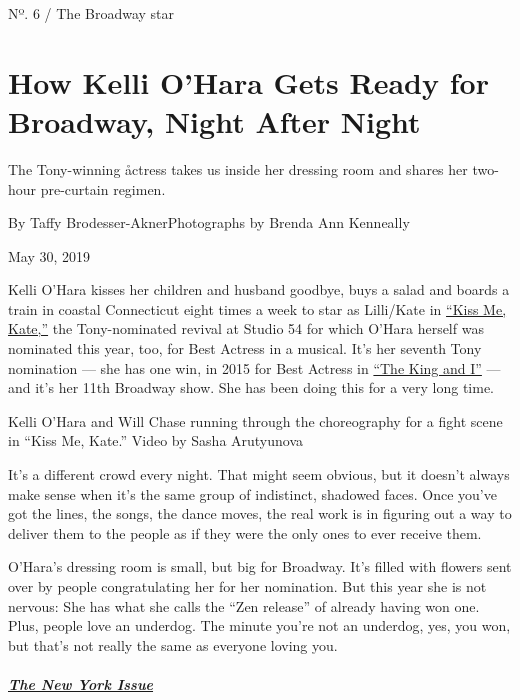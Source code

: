 Nº. 6 / The Broadway star

\hypertarget{how-kelli-ohara-gets-ready-for-broadway-night-after-night-1}{%
\section{How Kelli O'Hara Gets Ready for Broadway, Night After
Night}\label{how-kelli-ohara-gets-ready-for-broadway-night-after-night-1}}

The Tony-winning åctress takes us inside her dressing room and shares
her two-hour pre-curtain regimen.

By Taffy Brodesser-AknerPhotographs by Brenda Ann Kenneally

May 30, 2019

Kelli O'Hara kisses her children and husband goodbye, buys a salad and
boards a train in coastal Connecticut eight times a week to star as
Lilli/Kate in
\href{https://www.nytimes3xbfgragh.onion/2019/03/14/theater/kiss-me-kate-review.html}{``Kiss
Me, Kate,''} the Tony-nominated revival at Studio 54 for which O'Hara
herself was nominated this year, too, for Best Actress in a musical.
It's her seventh Tony nomination --- she has one win, in 2015 for Best
Actress in
\href{https://www.nytimes3xbfgragh.onion/2015/04/17/theater/review-the-king-and-i-back-on-broadway.html}{``The
King and I''} --- and it's her 11th Broadway show. She has been doing
this for a very long time.

Kelli O'Hara and Will Chase running through the choreography for a fight
scene in ``Kiss Me, Kate.'' Video by Sasha Arutyunova

It's a different crowd every night. That might seem obvious, but it
doesn't always make sense when it's the same group of indistinct,
shadowed faces. Once you've got the lines, the songs, the dance moves,
the real work is in figuring out a way to deliver them to the people as
if they were the only ones to ever receive them.

O'Hara's dressing room is small, but big for Broadway. It's filled with
flowers sent over by people congratulating her for her nomination. But
this year she is not nervous: She has what she calls the ``Zen release''
of already having won one. Plus, people love an underdog. The minute
you're not an underdog, yes, you won, but that's not really the same as
everyone loving you.

\hypertarget{the-new-york-issue}{%
\subparagraph{\texorpdfstring{\href{https://www.nytimes3xbfgragh.onion/interactive/2019/05/30/magazine/performers-new-york.html}{The
New York Issue}}{The New York Issue}}\label{the-new-york-issue}}

